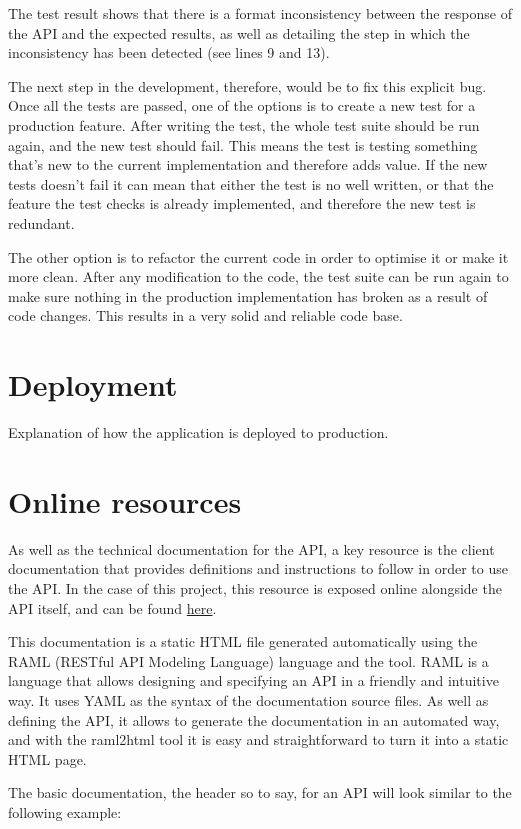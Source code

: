 The test result shows that there is a format inconsistency between the response of the API and the expected results, as well as detailing the step in which the inconsistency has been detected (see lines 9 and 13).

The next step in the development, therefore, would be to fix this explicit bug. Once all the tests are passed, one of the options is to create a new test for a production feature. After writing the test, the whole test suite should be run again, and the new test should fail. This means the test is testing something that’s new to the current implementation and therefore adds value. If the new tests doesn’t fail it can mean that either the test is no well written, or that the feature the test checks is already implemented, and therefore the new test is redundant.

The other option is to refactor the current code in order to optimise it or make it more clean. After any modification to the code, the test suite can be run again to make sure nothing in the production implementation has broken as a result of code changes. This results in a very solid and reliable code base.

\section{Deployment}
Explanation of how the application is deployed to production.

\section{Online resources}
As well as the technical documentation for the API, a key resource is the client documentation that provides definitions and instructions to follow in order to use the API. In the case of this project, this resource is exposed online alongside the API itself, and can be found \href{http://smapp.sorters.io/docs}{here}.

This documentation is a static HTML file generated automatically using the RAML (RESTful API Modeling Language) language and the  tool. RAML is a language that allows designing and specifying an API in a friendly and intuitive way. It uses YAML as the syntax of the documentation source files. As well as defining the API, it allows to generate the documentation in an automated way, and with the raml2html tool it is easy and straightforward to turn it into a static HTML page.

The basic documentation, the header so to say, for an API will look similar to the following example:

